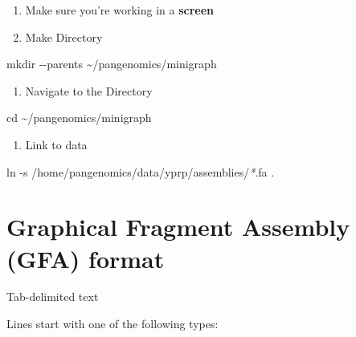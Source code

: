 \documentclass[
]{book}
\newenvironment{Shaded}{\begin{snugshade}}{\end{snugshade}}
\newcommand{\AttributeTok}[1]{\textcolor[rgb]{0.77,0.63,0.00}{#1}}
\newcommand{\BuiltInTok}[1]{#1}
\newcommand{\FunctionTok}[1]{\textcolor[rgb]{0.00,0.00,0.00}{#1}}
\newcommand{\NormalTok}[1]{#1}
\newcommand{\PreprocessorTok}[1]{\textcolor[rgb]{0.56,0.35,0.01}{\textit{#1}}}
\providecommand{\tightlist}{%
  \setlength{\itemsep}{0pt}\setlength{\parskip}{0pt}}
\begin{document}
\begin{enumerate}
\def\labelenumi{\arabic{enumi}.}
\item
  Make sure you're working in a \textbf{screen}
\item
  Make Directory
\end{enumerate}

\begin{Shaded}
\begin{Highlighting}[]
\FunctionTok{mkdir} \AttributeTok{{-}{-}parents}\NormalTok{ \textasciitilde{}/pangenomics/minigraph}
\end{Highlighting}
\end{Shaded}

\begin{enumerate}
\def\labelenumi{\arabic{enumi}.}
\setcounter{enumi}{2}
\tightlist
\item
  Navigate to the Directory
\end{enumerate}

\begin{Shaded}
\begin{Highlighting}[]
\BuiltInTok{cd}\NormalTok{ \textasciitilde{}/pangenomics/minigraph}
\end{Highlighting}
\end{Shaded}

\begin{enumerate}
\def\labelenumi{\arabic{enumi}.}
\setcounter{enumi}{3}
\tightlist
\item
  Link to data
\end{enumerate}

\begin{Shaded}
\begin{Highlighting}[]
\FunctionTok{ln} \AttributeTok{{-}s}\NormalTok{ /home/pangenomics/data/yprp/assemblies/}\PreprocessorTok{*}\NormalTok{.fa .}
\end{Highlighting}
\end{Shaded}

\hypertarget{graphical-fragment-assembly-gfa-format}{%
\section{Graphical Fragment Assembly (GFA) format}\label{graphical-fragment-assembly-gfa-format}}

Tab-delimited text

Lines start with one of the following types:
\end{document}
